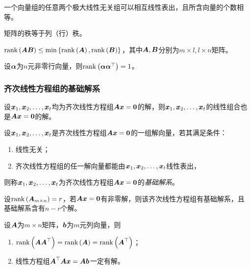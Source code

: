 \documentclass{ctexart}
\begin{document}
\begin{theorem}
    一个向量组的任意两个极大线性无关组可以相互线性表出，且所含向量的个数相等。
\end{theorem}

\begin{theorem}
    矩阵的秩等于列（行）秩。
\end{theorem}

\begin{theorem}
    \(\rank{\mata\matb}\le\min\setof{\rank{\mata},\rank{\matb}}\)，其中\(\mata,\matb\)分别为\(m\times l,l\times n\)矩阵。
\end{theorem}

\begin{infer}
    设\(\vecal\)为\(n\)元非零行向量，则\(\rank{\vecal\vecal^\top}=1\)。
\end{infer}

\subsubsection*{齐次线性方程组的基础解系}

\begin{theorem}
    设\(\enums{\vecx}{t}\)均为齐次线性方程组\(\mata\vecx=\veczero\)的解，则\(\enums{\vecx}{t}\)的线性组合也是\(\mata\vecx=\veczero\)的解。
\end{theorem}

\begin{definition}[基础解系]
    设\(\enums{\vecx}{t}\)是齐次线性方程组\(\mata\vecx=\veczero\)的一组解向量，若其满足条件：
    \begin{enumerate}
        \item 线性无关；
        \item 齐次线性方程组的任一解向量都能由\(\enums{\vecx}{t}\)线性表出，
    \end{enumerate}
    则称\(\enums{\vecx}{t}\)为齐次线性方程组\(\mata\vecx=\veczero\)的\emph{基础解系}。
\end{definition}

\begin{theorem}
    设\(\rank{\mata_{m\times n}}=r\)，若\(\mata\vecx=\veczero\)有非零解，则该齐次线性方程组有基础解系，且基础解系含有\(n-r\)个解。
\end{theorem}

\begin{theorem}
    设\(\mata\)为\(m\times n\)矩阵，\(\vecb\)为\(m\)元列向量，则
    \begin{enumerate}
        \item \(\rank{\mata\mata^\top}=\rank{\mata}=\rank{\mata^\top}\)；
        \item 线性方程组\(\mata^\top\mata\vecx=\mata\vecb\)一定有解。
    \end{enumerate}
\end{theorem}
\end{document}
